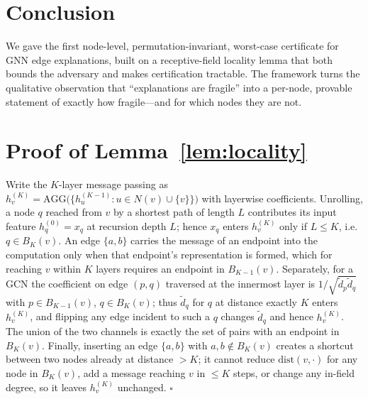 \documentclass[11pt]{article}
\begin{document}
\section{Conclusion}
We gave the first node-level, permutation-invariant, worst-case certificate for
GNN edge explanations, built on a receptive-field locality lemma that both bounds
the adversary and makes certification tractable. The framework turns the
qualitative observation that ``explanations are fragile'' into a per-node,
provable statement of exactly how fragile---and for which nodes they are not.

\appendix
\section{Proof of Lemma~\ref{lem:locality}}
Write the $K$-layer message passing as $h_v^{(K)}=\mathrm{AGG}\big(\{h_u^{(K-1)}:
u\in N(v)\cup\{v\}\}\big)$ with layerwise coefficients. Unrolling, a node $q$
reached from $v$ by a shortest path of length $L$ contributes its input feature
$h_q^{(0)}=x_q$ at recursion depth $L$; hence $x_q$ enters $h_v^{(K)}$ only if
$L\le K$, i.e.\ $q\in B_K(v)$. An edge $\{a,b\}$ carries the message of an
endpoint into the computation only when that endpoint's representation is formed,
which for reaching $v$ within $K$ layers requires an endpoint in $B_{K-1}(v)$.
Separately, for a GCN the coefficient on edge $(p,q)$ traversed at the innermost
layer is $1/\sqrt{\tilde d_p \tilde d_q}$ with $p\in B_{K-1}(v)$, $q\in B_K(v)$;
thus $\tilde d_q$ for $q$ at distance exactly $K$ enters $h_v^{(K)}$, and flipping
any edge incident to such a $q$ changes $\tilde d_q$ and hence $h_v^{(K)}$. The
union of the two channels is exactly the set of pairs with an endpoint in
$B_K(v)$. Finally, inserting an edge $\{a,b\}$ with $a,b\notin B_K(v)$ creates a
shortcut between two nodes already at distance $>K$; it cannot reduce
$\mathrm{dist}(v,\cdot)$ for any node in $B_K(v)$, add a message reaching $v$ in
$\le K$ steps, or change any in-field degree, so it leaves $h_v^{(K)}$ unchanged.
$\square$
\end{document}
